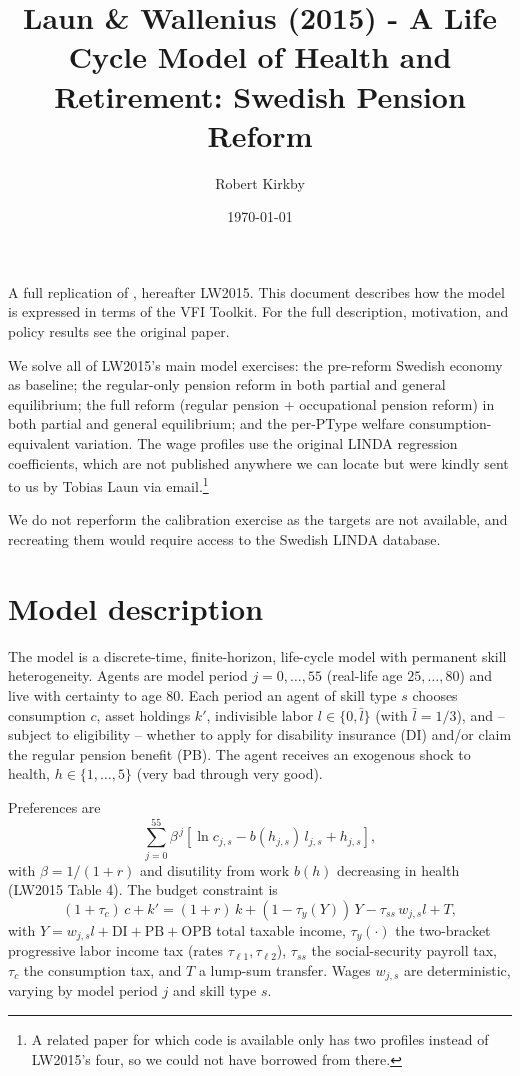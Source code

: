 \documentclass[11pt,fleqn]{article}
\begin{document}
\title{Laun \& Wallenius (2015) - A Life Cycle Model of Health and Retirement: Swedish Pension Reform}
\author{Robert Kirkby}
\date{\today}
\maketitle

A full replication of \citet{LaunWallenius2015}, hereafter LW2015. This document describes how the model is expressed in terms of the VFI Toolkit. For the full description, motivation, and policy results see the original paper.

We solve all of LW2015's main model exercises: the pre-reform Swedish economy as baseline; the regular-only pension reform in both partial and general equilibrium; the full reform (regular pension + occupational pension reform) in both partial and general equilibrium; and the per-PType welfare consumption-equivalent variation. The wage profiles use the original LINDA regression coefficients, which are not published anywhere we can locate but were kindly sent to us by Tobias Laun via email.\footnote{A related paper \citet{LaunWallenius2016} for which code is available only has two profiles instead of LW2015's four, so we could not have borrowed from there.}

We do not reperform the calibration exercise as the targets are not available, and recreating them would require access to the Swedish LINDA database.


\section{Model description}
The model is a discrete-time, finite-horizon, life-cycle model with permanent skill heterogeneity. Agents are model period $j=0,\ldots,55$ (real-life age $25,\ldots,80$) and live with certainty to age $80$. Each period an agent of skill type $s$ chooses consumption $c$, asset holdings $k'$, indivisible labor $l\in\{0,\bar l\}$ (with $\bar l = 1/3$), and -- subject to eligibility -- whether to apply for disability insurance (DI) and/or claim the regular pension benefit (PB). The agent receives an exogenous shock to health, $h\in\{1,\ldots,5\}$ (very bad through very good).

Preferences are
\begin{equation*}
 \sum_{j=0}^{55} \beta^{\,j} \left[ \ln c_{j,s} - b(h_{j,s})\, l_{j,s} + h_{j,s} \right],
\end{equation*}
with $\beta=1/(1+r)$ and disutility from work $b(h)$ decreasing in health (LW2015 Table 4). The budget constraint is
\begin{equation*}
 (1+\tau_c)\, c + k' = (1+r)\, k + (1-\tau_y(Y))\, Y - \tau_{ss}\, w_{j,s} l + T,
\end{equation*}
with $Y = w_{j,s} l + \text{DI} + \text{PB} + \text{OPB}$ total taxable income, $\tau_y(\cdot)$ the two-bracket progressive labor income tax (rates $\tau_{\ell1}, \tau_{\ell2}$), $\tau_{ss}$ the social-security payroll tax, $\tau_c$ the consumption tax, and $T$ a lump-sum transfer. Wages $w_{j,s}$ are deterministic, varying by model period $j$ and skill type $s$.
\end{document}
